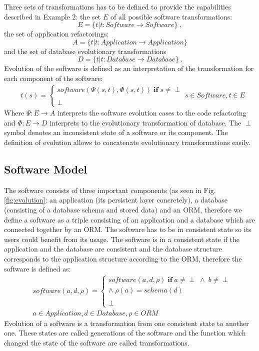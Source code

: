 \documentclass[runningheads]{comsis}
\begin{document}
Three sets of transformations has to be defined to provide the capabilities described in Example 2: the set $E$ of all possible software transformations:
\begin{equation}
E = \{t | t: Software \rightarrow Software\}\:,
\end{equation}
the set of application refactorings:
\begin{equation}
A = \{t | t: Application \rightarrow Application\}
\end{equation}
and the set of database evolutionary transformations
\begin{equation}
 D = \{t | t: Database \rightarrow Database\}\:.
\end{equation}
Evolution of the software is defined as an interpretation of the transformation for each component of the software:
\begin{align}
& t(s) = \begin{cases}
software(\Psi(s, t), \Phi(s,t)) \; \mathbf{if} \; s \neq \perp \\\\
 	\perp
\end{cases}
s \in Software, t \in E \nonumber
\end{align}
Where $\Psi : E \rightarrow A $ interprets the software evolution cases to the code refactoring and $\Phi : E \rightarrow D $ interprets to the evolutionary transformation of database. The $\perp$ symbol denotes an inconsistent state of a software or its component. The definition of evolution allows to concatenate evolutionary transformations easily. 

\subsection{Software Model}
The software consists of three important components (as seen in Fig. \ref{fig:evolution}: an application (its persistent layer concretely), a database (consisting of a database schema and stored data) and an ORM, therefore we define a software as a triple consisting of an application and a database which are connected together by an ORM.
The software has to be in consistent state so its users could benefit from its usage. The software is in a consistent state if the application and the database are consistent and the database structure corresponds to the application structure according to the ORM, therefore the software is defined as:
\begin{align}
& software(a, d, \rho) = \begin{cases}
 software(a, d, \rho) \; \textbf{if} \; a \neq \perp \; \wedge \; b \neq \perp \\ \wedge \; \rho(a) = schema(d) 
 \\\\
 \perp
 \end{cases}\\
& a \in Application, d \in Database, \rho \in ORM \nonumber
\end{align}
Evolution of a software is a transformation from one consistent state to another one. These states are called generations of the software and the function which changed the state of the software are called transformations. 
\end{document}
